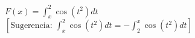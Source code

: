 \item $\displaystyle F(x) = \int_x^2 \cos(t^2) dt$ \\
$\left[\text{Sugerencia: } \int_x^2 \cos(t^2) dt = - \int_2^x \cos(t^2) dt\right]$
